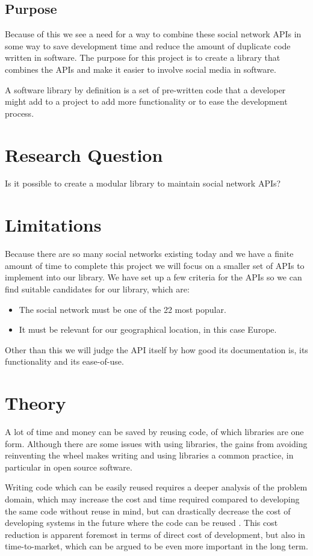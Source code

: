 \documentclass{sigchi}
\begin{document}
\subsection{Purpose}
Because of this we see a need for a way to combine these social network APIs in some way to save development
time and reduce the amount of duplicate code written in software. The purpose for this project is to create a library that combines the APIs and
make it easier to involve social media in software.

A software library by definition is a set of pre-written code that a developer might add to a project to add more functionality or to ease the 
development process\cite{TLDP_LIBRARY_DEFINITION}.

\section{Research Question}
Is it possible to create a modular library to maintain social network APIs?

\section{Limitations}
Because there are so many social networks existing today and we have a finite amount of time to complete this
 project we will focus on a smaller set of APIs to implement into our library.  We have set up a few criteria 
 for the APIs so we can find suitable candidates for our library, which are:
\begin{itemize}
	\item The social network must be one of the 22 most popular\cite{STATISTA_LEADING_SOCIAL_NETWORKS}.
	\item It must be relevant for our geographical location, in this case Europe.
\end{itemize}
Other than this we will judge the API itself by how good its documentation is, its functionality and its ease-of-use. 

\section{Theory}
A lot of time and money can be saved by reusing code, of which libraries are one form. Although there are
some issues with using libraries, the gains from avoiding reinventing the wheel makes writing and using
libraries a common practice, in particular in open source software\cite{2998479020080101}.

Writing code which can be easily reused requires a deeper analysis of the problem domain, which may increase the cost and time required compared 
to developing the same code without reuse in mind, but can drastically decrease the cost of developing systems in the future where the code can 
be reused \cite{lim1994effects}. This cost reduction is apparent foremost in terms of direct cost of development, but also in time-to-market, 
which can be argued to be even more important in the long term\cite{griss1993software}.
\end{document}
